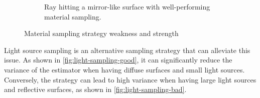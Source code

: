 \begin{figure}[H]
\begin{subfigure}[t]{0.45\textwidth}
    \caption{Ray hitting a mirror-like surface with well-performing material sampling.}
    \label{fig:material-sampling-good}
  \end{subfigure}
  \caption{Material sampling strategy weakness and strength}
  \label{fig:material-sampling}
\end{figure}

Light source sampling is an alternative sampling strategy that can alleviate this issue. As shown in \autoref{fig:light-sampling-good}, it can significantly reduce the variance of the estimator when having diffuse surfaces and small light sources. Conversely, the strategy can lead to high variance when having large light sources and reflective surfaces, as shown in \autoref{fig:light-sampling-bad}.

